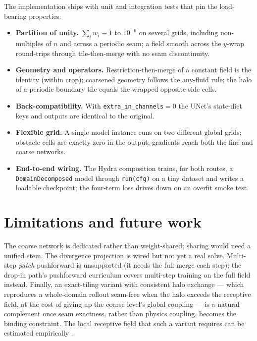 \documentclass[11pt]{article}
\newcommand{\code}[1]{\texttt{#1}}
\begin{document}
The implementation ships with unit and integration tests that pin the load-bearing
properties:
\begin{itemize}
\item \textbf{Partition of unity.} $\sum_i w_i\equiv1$ to $10^{-6}$ on several
grids, including non-multiples of $n$ and across a periodic seam; a field smooth
across the $y$-wrap round-trips through tile-then-merge with no seam discontinuity.
\item \textbf{Geometry and operators.} Restriction-then-merge of a constant field is
the identity (within crop); coarsened geometry follows the any-fluid rule; the halo
of a periodic boundary tile equals the wrapped opposite-side cells.
\item \textbf{Back-compatibility.} With \code{extra\_in\_channels}$=0$ the UNet's
state-dict keys and outputs are identical to the original.
\item \textbf{Flexible grid.} A single model instance runs on two different global
grids; obstacle cells are exactly zero in the output; gradients reach both the fine
and coarse networks.
\item \textbf{End-to-end wiring.} The Hydra composition trains, for both routes, a
\code{DomainDecomposed} model through \code{run(cfg)} on a tiny dataset and writes a
loadable checkpoint; the four-term loss drives down on an overfit smoke test.
\end{itemize}

\section{Limitations and future work}\label{sec:future}

The coarse network is dedicated rather than weight-shared; sharing would need a
unified stem. The divergence projection is wired but not yet a real solve.
Multi-step \emph{patch} pushforward is unsupported (it needs the full merge each
step); the drop-in path's pushforward curriculum covers multi-step training on the
full field instead. Finally, an exact-tiling variant with consistent halo exchange
\cite{barwey2024consistentgnn,li2020deepddm,huang2025operatorddm} --- which
reproduces a whole-domain rollout seam-free when the halo exceeds the receptive
field, at the cost of giving up the coarse level's global coupling --- is a natural
complement once seam exactness, rather than physics coupling, becomes the binding
constraint. The local receptive field that such a variant requires can be estimated
empirically \cite{ye2024lno}.



\end{document}
